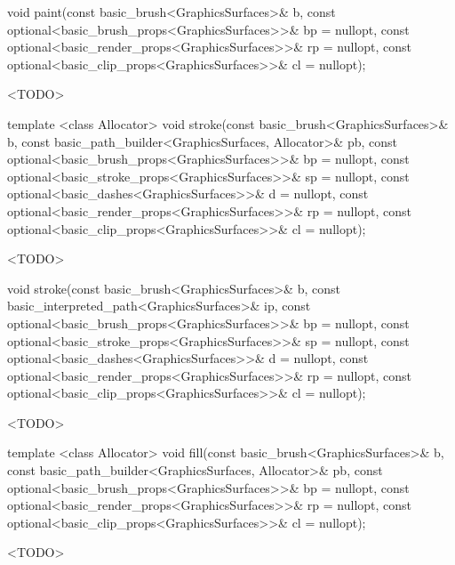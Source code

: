 %
\begin{itemdecl}
void paint(const basic_brush<GraphicsSurfaces>& b,
  const optional<basic_brush_props<GraphicsSurfaces>>& bp = nullopt,
  const optional<basic_render_props<GraphicsSurfaces>>& rp = nullopt,
  const optional<basic_clip_props<GraphicsSurfaces>>& cl = nullopt);
\end{itemdecl}
\begin{itemdescr}
\pnum
\effects
<TODO>
\end{itemdescr}

%
\begin{itemdecl}
template <class Allocator>
void stroke(const basic_brush<GraphicsSurfaces>& b,
  const basic_path_builder<GraphicsSurfaces, Allocator>& pb,
  const optional<basic_brush_props<GraphicsSurfaces>>& bp = nullopt,
  const optional<basic_stroke_props<GraphicsSurfaces>>& sp = nullopt,
  const optional<basic_dashes<GraphicsSurfaces>>& d = nullopt,
  const optional<basic_render_props<GraphicsSurfaces>>& rp = nullopt,
  const optional<basic_clip_props<GraphicsSurfaces>>& cl = nullopt);
\end{itemdecl}
\begin{itemdescr}
\pnum
\effects
<TODO>
\end{itemdescr}

%
\begin{itemdecl}
void stroke(const basic_brush<GraphicsSurfaces>& b,
  const basic_interpreted_path<GraphicsSurfaces>& ip,
  const optional<basic_brush_props<GraphicsSurfaces>>& bp = nullopt,
  const optional<basic_stroke_props<GraphicsSurfaces>>& sp = nullopt,
  const optional<basic_dashes<GraphicsSurfaces>>& d = nullopt,
  const optional<basic_render_props<GraphicsSurfaces>>& rp = nullopt,
  const optional<basic_clip_props<GraphicsSurfaces>>& cl = nullopt);
\end{itemdecl}
\begin{itemdescr}
\pnum
\effects
<TODO>
\end{itemdescr}

%
\begin{itemdecl}
template <class Allocator>
void fill(const basic_brush<GraphicsSurfaces>& b,
  const basic_path_builder<GraphicsSurfaces, Allocator>& pb,
  const optional<basic_brush_props<GraphicsSurfaces>>& bp = nullopt,
  const optional<basic_render_props<GraphicsSurfaces>>& rp = nullopt,
  const optional<basic_clip_props<GraphicsSurfaces>>& cl = nullopt);
\end{itemdecl}
\begin{itemdescr}
\pnum
\effects
<TODO>
\end{itemdescr}

